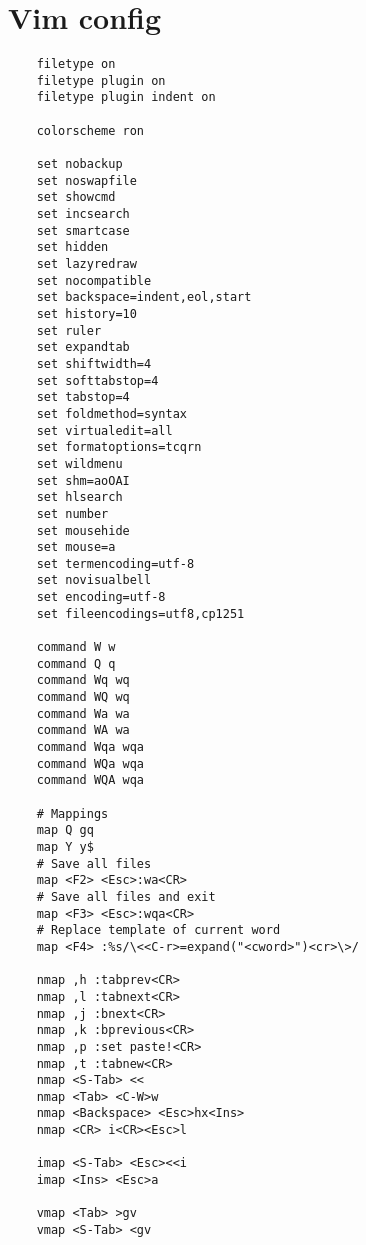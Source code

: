 \documentclass{article}
\begin{document}
\section{Vim config}
\begin{verbatim}
    filetype on                                      
    filetype plugin on
    filetype plugin indent on

    colorscheme ron

    set nobackup                                
    set noswapfile                              
    set showcmd                                 
    set incsearch                               
    set smartcase                               
    set hidden                                  
    set lazyredraw                              
    set nocompatible  
    set backspace=indent,eol,start              
    set history=10                              
    set ruler                                   
    set expandtab                               
    set shiftwidth=4                            
    set softtabstop=4                           
    set tabstop=4                               
    set foldmethod=syntax                       
    set virtualedit=all                         
    set formatoptions=tcqrn                     
    set wildmenu                                
    set shm=aoOAI                               
    set hlsearch                                
    set number                                  
    set mousehide                               
    set mouse=a                                 
    set termencoding=utf-8                      
    set novisualbell                            
    set encoding=utf-8                          
    set fileencodings=utf8,cp1251               

    command W w
    command Q q
    command Wq wq
    command WQ wq
    command Wa wa
    command WA wa
    command Wqa wqa
    command WQa wqa
    command WQA wqa

    # Mappings 
    map Q gq
    map Y y$
    # Save all files 
    map <F2> <Esc>:wa<CR>                           
    # Save all files and exit
    map <F3> <Esc>:wqa<CR>
    # Replace template of current word 
    map <F4> :%s/\<<C-r>=expand("<cword>")<cr>\>/

    nmap ,h :tabprev<CR>
    nmap ,l :tabnext<CR>
    nmap ,j :bnext<CR>
    nmap ,k :bprevious<CR> 
    nmap ,p :set paste!<CR>
    nmap ,t :tabnew<CR>
    nmap <S-Tab> <<
    nmap <Tab> <C-W>w
    nmap <Backspace> <Esc>hx<Ins>
    nmap <CR> i<CR><Esc>l

    imap <S-Tab> <Esc><<i
    imap <Ins> <Esc>a

    vmap <Tab> >gv
    vmap <S-Tab> <gv
\end{verbatim}
\end{document}
